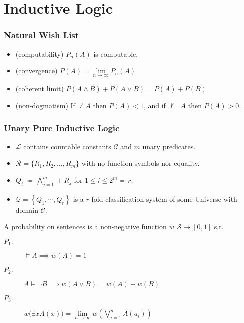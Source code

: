 \documentclass[UTF8,11pt,colorlinks,compress,openany]{beamer}%
\begin{document}
\section{Inductive Logic}

\begin{frame}\frametitle{Natural Wish List}
	\begin{itemize}
		\item (computability) $P_n(A)$ is computable.
		\item (convergence) $P(A)=\lim\limits_{n\to\infty}P_n(A)$
		\item (coherent limit) $P(A\wedge B)+P(A\vee B)=P(A)+P(B)$
		\item (non-dogmatism) If $\nvdash A$ then $P(A)<1$, and if $\nvdash\neg A$ then $P(A)>0$.
	\end{itemize}
\end{frame}

\begin{frame}\frametitle{Unary Pure Inductive Logic}
	\begin{itemize}
		\item $\mathscr{L}$ contains countable constants $\mathcal{C}$ and $m$ unary predicates.
		\item $\mathcal{R}=\{R_1,R_2,\ldots,R_m\}$ with no function symbols nor equality.
		\item $Q_i\,\coloneqq \,\bigwedge\limits_{j=1}^m\pm R_j$ for $1\leq i\leq 2^m\eqqcolon r$.
		\item $\mathcal{Q}=\left\{Q_1,\cdots,Q_r\right\}$ is a $r$-fold classification system of some Universe with domain $\mathcal{C}$.
	\end{itemize}
	\begin{definition}
		\noindent A probability on sentences is a non-negative function $w:\mathcal{S}\to[0,1]$ s.t.
		\begin{description}
			\item[$P_1.$] $\vDash A\implies w(A)=1$
			\item[$P_2.$] $A\vDash\neg B\implies w(A\vee B)=w(A)+w(B)$
			\item[$P_3.$] $w\big(\exists x A(x)\big)=\lim\limits_{n\to\infty} w\left(\bigvee\limits_{i=1}^n A(a_i)\right)$
		\end{description}
	\end{definition}
\end{frame}
\end{document}
